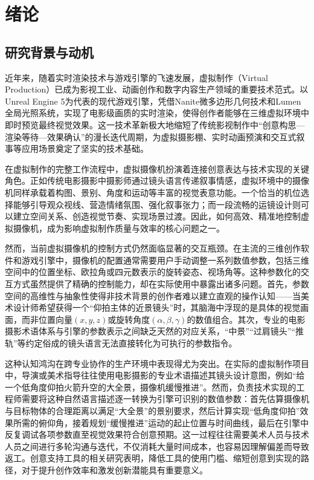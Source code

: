 \chapter{绪论}
\label{chap:intro}
\section{研究背景与动机}

近年来，随着实时渲染技术与游戏引擎的飞速发展，虚拟制作（Virtual Production）已成为影视工业、动画创作和数字内容生产领域的重要技术范式\cite{kadner2019virtual}。以Unreal Engine 5为代表的现代游戏引擎，凭借Nanite微多边形几何技术和Lumen全局光照系统\cite{karis2021nanite,kato2022lumen}，实现了电影级画质的实时渲染，使得创作者能够在三维虚拟环境中即时预览最终视觉效果。这一技术革新极大地缩短了传统影视制作中“创意构思—渲染等待—效果确认”的漫长迭代周期，为虚拟摄影棚、实时动画预演和交互式叙事等应用场景奠定了坚实的技术基础\cite{goualard2022taxonomy}。

在虚拟制作的完整工作流程中，虚拟摄像机扮演着连接创意表达与技术实现的关键角色。正如传统电影摄影中摄影师通过镜头语言传递叙事情感，虚拟环境中的摄像机同样承载着构图、景别、角度和运动等丰富的视觉表意功能\cite{arijon1976grammar,mascelli1965five}。一个恰当的机位选择能够引导观众视线、营造情绪氛围、强化叙事张力；而一段流畅的运镜设计则可以建立空间关系、创造视觉节奏、实现场景过渡。因此，如何高效、精准地控制虚拟摄像机，成为影响虚拟制作质量与效率的核心问题之一。

然而，当前虚拟摄像机的控制方式仍然面临显著的交互瓶颈。在主流的三维创作软件和游戏引擎中，摄像机的配置通常需要用户手动调整一系列数值参数，包括三维空间中的位置坐标、欧拉角或四元数表示的旋转姿态、视场角等。这种参数化的交互方式虽然提供了精确的控制能力，却在实际使用中暴露出诸多问题。首先，参数空间的高维性与抽象性使得非技术背景的创作者难以建立直观的操作认知——当美术设计师希望获得一个“仰拍主体的近景镜头”时，其脑海中浮现的是具体的视觉画面，而非位置向量$(x, y, z)$或旋转角度$(\alpha, \beta, \gamma)$的数值组合。其次，专业的电影摄影术语体系与引擎的参数表示之间缺乏天然的对应关系，“中景”“过肩镜头”“推轨”等约定俗成的镜头语言无法直接转化为可执行的参数指令。

这种认知鸿沟在跨专业协作的生产环境中表现得尤为突出。在实际的虚拟制作项目中，导演或美术指导往往使用电影摄影的专业术语描述其镜头设计意图，例如“给一个低角度仰拍火箭升空的大全景，摄像机缓慢推进”。然而，负责技术实现的工程师需要将这种自然语言描述逐一转换为引擎可识别的数值参数：首先估算摄像机与目标物体的合理距离以满足“大全景”的景别要求，然后计算实现“低角度仰拍”效果所需的俯仰角，接着规划“缓慢推进”运动的起止位置与时间曲线，最后在引擎中反复调试各项参数直至视觉效果符合创意预期。这一过程往往需要美术人员与技术人员之间进行多轮沟通与迭代，不仅消耗大量时间成本，也容易因理解偏差而导致返工。创意支持工具的相关研究表明\cite{shneiderman2007creativity,frich2019creativity}，降低工具的使用门槛、缩短创意到实现的路径，对于提升创作效率和激发创新潜能具有重要意义。


